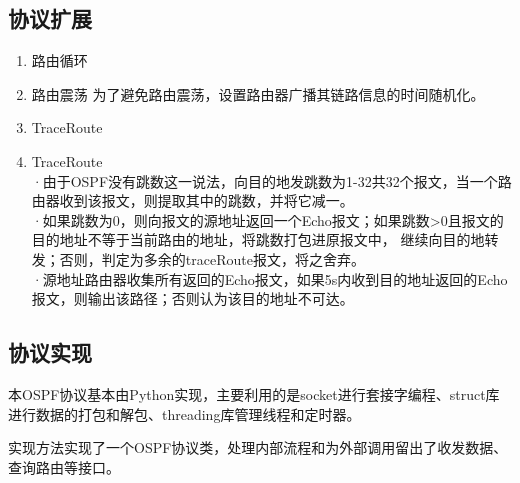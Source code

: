 \subsection{协议扩展} %
\label{sub:协议扩展}
\begin{enumerate}
	\item 路由循环
	\item 路由震荡
	      为了避免路由震荡，设置路由器广播其链路信息的时间随机化。
	\item TraceRoute
	\item TraceRoute\\
	      ·由于OSPF没有跳数这一说法，向目的地发跳数为1-32共32个报文，当一个路由器收到该报文，则提取其中的跳数，并将它减一。\\
	      ·如果跳数为0，则向报文的源地址返回一个Echo报文；如果跳数>0且报文的目的地址不等于当前路由的地址，将跳数打包进原报文中，
	      继续向目的地转发；否则，判定为多余的traceRoute报文，将之舍弃。\\
	      ·源地址路由器收集所有返回的Echo报文，如果5s内收到目的地址返回的Echo报文，则输出该路径；否则认为该目的地址不可达。
\end{enumerate}
\subsection{协议实现} %
\label{sub:协议实现}
本OSPF协议基本由Python实现，主要利用的是socket进行套接字编程、struct库进行数据的打包和解包、threading库管理线程和定时器。
\par 实现方法实现了一个OSPF协议类，处理内部流程和为外部调用留出了收发数据、查询路由等接口。
